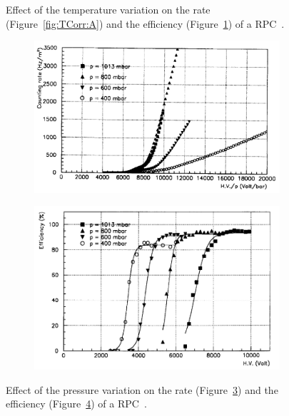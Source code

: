 \begin{figure}[H]
\begin{subfigure}{0.5\linewidth}
			\caption{\label{fig:TCorr:B}}
		\end{subfigure}
		\caption{\label{fig:TCorr} Effect of the temperature variation on the rate (Figure~\ref{fig:TCorr:A}) and the efficiency (Figure~\ref{fig:TCorr:B}) of a RPC~\cite{ABBRESCIA1995}.}
	\end{figure}
	
	\begin{figure}[H]
		\begin{subfigure}{\linewidth}
			\centering
			\includegraphics[width = 0.7\plotwidth]{fig/chapt4/Rate-pressure.png}\\
			\caption{\label{fig:PCorr:A}}
		\end{subfigure}
		\begin{subfigure}{\linewidth}
		    \centering
			\includegraphics[width = 0.7\plotwidth]{fig/chapt4/Efficiency-pressure.png}
			\caption{\label{fig:PCorr:B}}
		\end{subfigure}
		\caption{\label{fig:PCorr} Effect of the pressure variation on the rate (Figure~\ref{fig:PCorr:A}) and the efficiency (Figure~\ref{fig:PCorr:B}) of a RPC~\cite{ABBRESCIA1997PRES}.}
	\end{figure}
	
